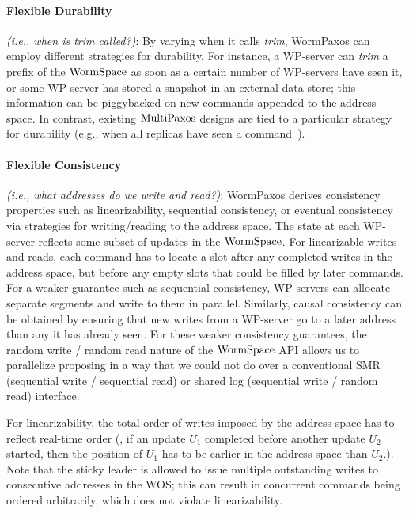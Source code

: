 {\paragraph{Flexible Durability} \textit{(i.e., when is \textit{trim} called?)}: By varying when it calls \textit{trim}, 
WormPaxos can employ different strategies for durability. For instance, a WP-server can \textit{trim} a prefix of the $\mathrm{WormSpace}$ 
as soon as a certain number of WP-servers{} have seen it, or some WP-server has stored a snapshot in an external data store; 
this information can be piggybacked on new commands appended to the address space. 
In contrast, existing $\mathrm{MultiPaxos}$ designs are tied to a particular strategy for durability (e.g., when all replicas have seen a command~\cite{rvrpaxos}).

\paragraph{Flexible Consistency} \textit{(i.e., what addresses do we \textit{write} and \textit{read}?)}: 
WormPaxos derives consistency properties such as linearizability, sequential consistency, 
or eventual consistency via strategies for writing/reading to the address space. 
The state at each WP-server reflects some subset of updates in the $\mathrm{WormSpace}$. 
For linearizable writes and reads, each command has to locate a slot after any completed writes in the address space, 
but before any empty slots that could be filled by later commands. For a weaker guarantee such as sequential consistency, 
WP-servers{} can allocate separate segments and write to them in parallel. 
Similarly, causal consistency can be obtained by ensuring that new writes from a WP-server go to a later address than any it has already seen.
For these weaker consistency guarantees, the random write / random read nature of the $\mathrm{WormSpace}$ 
API allows us to parallelize proposing in a way that we could not do over a conventional SMR 
(sequential write / sequential read) or shared log (sequential write / random read) interface. }

For linearizability, the total order of writes imposed by the address space has to reflect real-time order 
(\ie, if an update $U_1$ completed before another update $U_2$ started, then the position of $U_1$ has to be earlier in the address space than $U_2$.).
Note that the sticky leader is allowed to issue multiple outstanding writes to consecutive addresses in the WOS; 
this can result in concurrent commands being ordered arbitrarily, which does not violate linearizability.

